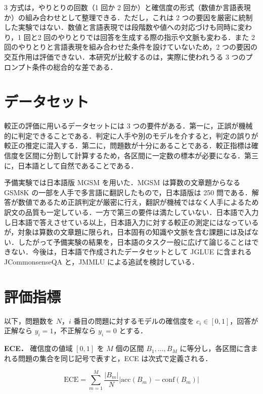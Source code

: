 3 方式は，やりとりの回数（1 回か 2 回か）と確信度の形式（数値か言語表現か）の組み合わせとして整理できる．ただし，これは 2 つの要因を厳密に統制した実験ではない．数値と言語表現では段階数や値への対応づけも同時に変わり，1 回と2 回のやりとりでは回答を生成する際の指示や文脈も変わる．また 2 回のやりとりと言語表現を組み合わせた条件を設けていないため，2 つの要因の交互作用は評価できない．本研究が比較するのは，実際に使われうる 3 つのプロンプト条件の総合的な差である．

\section{データセット}

較正の評価に用いるデータセットには 3 つの要件がある．第一に，正誤が機械的に判定できることである．判定に人手や別のモデルを介すると，判定の誤りが較正の推定に混入する．第二に，問題数が十分にあることである．較正指標は確信度を区間に分割して計算するため，各区間に一定数の標本が必要になる．第三に，日本語として自然であることである．

予備実験では日本語版 MGSM \cite{shi2023mgsm} を用いた．MGSM は算数の文章題からなるGSM8K \cite{cobbe2021gsm8k} の一部を人手で多言語に翻訳したもので，日本語版は 250 問である．解答が数値であるため正誤判定が厳密に行え，翻訳が機械ではなく人手によるため訳文の品質も一定している．一方で第三の要件は満たしていない．日本語で入力し日本語で答えさせている以上，日本語入力に対する較正の測定にはなっているが，対象は算数の文章題に限られ，日本固有の知識や文脈を含む課題には及ばない．したがって予備実験の結果を，日本語のタスク一般に広げて論じることはできない．今後は，日本語で作成されたデータセットとして JGLUE \cite{kurihara2022jglue} に含まれるJCommonsenseQA と，JMMLU による追試を検討している．

\section{評価指標}

以下，問題数を $N$，$i$ 番目の問題に対するモデルの確信度を $c_i \in [0,1]$，回答が正解なら $y_i = 1$，不正解なら $y_i = 0$ とする．

\textbf{ECE．} 確信度の値域 $[0,1]$ を $M$ 個の区間 $B_1, \dots, B_M$ に等分し，各区間に含まれる問題の集合を同じ記号で表すと，ECE は次式で定義される．

\begin{equation}
\mathrm{ECE} = \sum_{m=1}^{M} \frac{|B_m|}{N} \bigl| \mathrm{acc}(B_m) - \mathrm{conf}(B_m) \bigr|
\end{equation}

